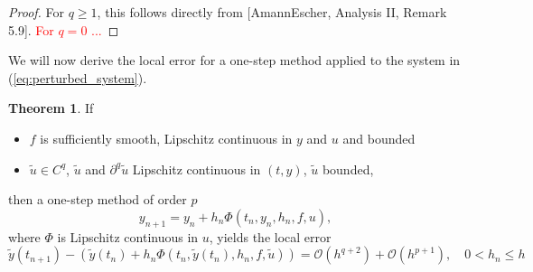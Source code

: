 \documentclass{book}
\theoremstyle{definition}
\newtheorem{theorem}{Theorem}
\begin{document}
\begin{proof}
    For $q\geq 1$, this follows directly from [AmannEscher, Analysis II, Remark 5.9]. \textcolor{red}{For $q = 0$  ...}
\end{proof}
We will now derive the local error for a one-step method applied to the system in (\ref{eq:perturbed_system}).
\begin{theorem}
    If 
    \begin{itemize}
        \item $f$ is sufficiently smooth, Lipschitz continuous in $y$ and $u$ and bounded
        \item $\tilde{u} \in C^{q}$, $\tilde{u}$ and $\partial^{q} \tilde{u}$ Lipschitz continuous in $(t, y)$, $\tilde{u}$ bounded,
    \end{itemize}
    then a one-step method of order $p$
    \[
        y_{n+1} = y_{n} + h_{n} \Phi (t_{n}, y_{n}, h_{n}, f, u),
    \]
    where $\Phi$ is Lipschitz continuous in $u$, yields the local error
    \[
        \tilde{y}(t_{n+1}) - (\tilde{y}(t_{n}) + h_{n} \Phi (t_{n}, \tilde{y}(t_{n}), h_{n}, f, \tilde{u}) ) = \mathcal{O} (h^{q+2}) + \mathcal{O} (h^{p+1}),\quad 0 < h_{n} \leq h
    \]
\end{theorem}
\end{document}
